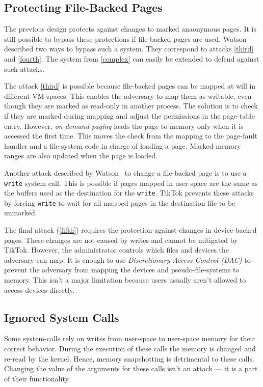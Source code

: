 \documentclass[conference]{IEEEtran}
\newcommand{\sysname}{TikTok}
\begin{document}
\subsection{Protecting File-Backed Pages}
\label{subsec:fileprot}
The previous design protects against changes to marked anaonymous pages. It is
still possible to bypass these protections if file-backed pages are used.
Watson~\cite{watson2007exploiting} described two ways to bypass such a system.
They correspond to attacks \autoref{third} and \autoref{fourth}. The system from
\autoref{complex} can easily be extended to defend against such attacks.

The attack \autoref{third} is possible because file-backed pages can be mapped
at will in different VM spaces. This enables the adversary to map them as
writable, even though they are marked as read-only in another process. The 
solution is to check if they are marked during mapping and adjust the permissions
in the page-table entry. However, \emph{on-demand paging} loads the page to memory
only when it is accessed the first time. This moves the check from the mapping to
the page-fault handler and a file-system code in charge of loading a page. Marked
memory ranges are also updated when the page is loaded.

Another attack described by Watson~\cite{watson2007exploiting} to change a
file-backed page is to use a \texttt{write} system call. This is possible if
pages mapped in user-space are the same as the buffers used as the destination
for the \texttt{write}. \sysname{} prevents these attacks by forcing
\texttt{write} to wait for all mapped pages in the destination file to be
unmarked.

The final attack (\autoref{fifth}) requires the protection against changes in
device-backed pages. These changes are not caused by writes and cannot be
mitigated by \sysname. However, the administrator controls which files and
devices the adversary can map. It is enough to use \emph{Discretionary Access
Control (DAC)} to prevent the adversary from mapping the devices and
pseudo-file-systems to memory. This isn't a major limitation because users
usually aren't allowed to access devices directly.

\subsection{Ignored System Calls}
\label{subsec:ignoredcalls}

Some system-calls rely on writes from user-space to user-space memory for their
correct behavior. During the execution of these calls the memory is changed and
re-read by the kernel. Hence, memory snapshotting is detrimental to these calls.
Changing the value of the arguments for these calls isn't an attack --- it is a
part of their functionality.
\end{document}
